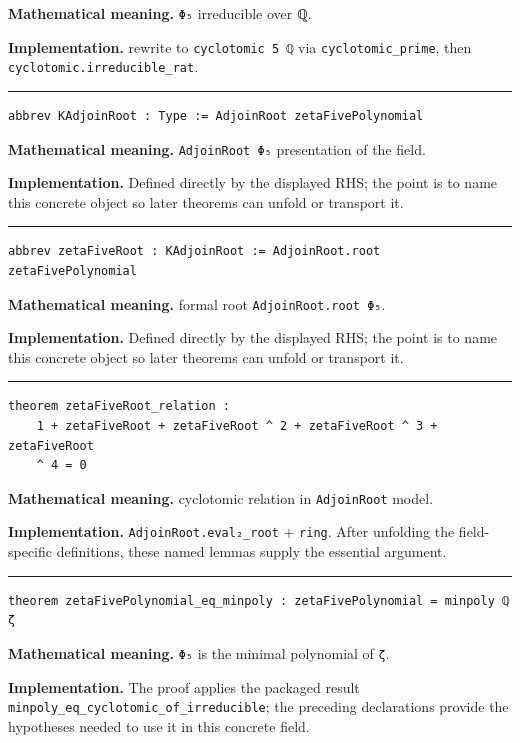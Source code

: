 \documentclass[UTF8,a4paper,11pt,fontset=fandol]{ctexart}
\theoremstyle{definition}
\newcommand{\statementsep}{\par\medskip\hrule\medskip}
\begin{document}
\noindent\textbf{Mathematical meaning.} \texttt{Φ₅} irreducible over ℚ.\par
\noindent\textbf{Implementation.} rewrite to \texttt{cyclotomic 5 ℚ} via \texttt{cyclotomic\_\allowbreak{}prime}, then \texttt{cyclotomic.\allowbreak{}irreducible\_\allowbreak{}rat}.\par
\statementsep
\begin{verbatim}
abbrev KAdjoinRoot : Type := AdjoinRoot zetaFivePolynomial
\end{verbatim}
\noindent\textbf{Mathematical meaning.} \texttt{AdjoinRoot Φ₅} presentation of the field.\par
\noindent\textbf{Implementation.} Defined directly by the displayed RHS; the point is to name this concrete object so later theorems can unfold or transport it.\par
\statementsep
\begin{verbatim}
abbrev zetaFiveRoot : KAdjoinRoot := AdjoinRoot.root zetaFivePolynomial
\end{verbatim}
\noindent\textbf{Mathematical meaning.} formal root \texttt{AdjoinRoot.\allowbreak{}root Φ₅}.\par
\noindent\textbf{Implementation.} Defined directly by the displayed RHS; the point is to name this concrete object so later theorems can unfold or transport it.\par
\statementsep
\begin{verbatim}
theorem zetaFiveRoot_relation :
    1 + zetaFiveRoot + zetaFiveRoot ^ 2 + zetaFiveRoot ^ 3 + zetaFiveRoot
    ^ 4 = 0
\end{verbatim}
\noindent\textbf{Mathematical meaning.} cyclotomic relation in \texttt{AdjoinRoot} model.\par
\noindent\textbf{Implementation.} \texttt{AdjoinRoot.\allowbreak{}eval₂\_\allowbreak{}root} + \texttt{ring}. After unfolding the field-specific definitions, these named lemmas supply the essential argument.\par
\statementsep
\begin{verbatim}
theorem zetaFivePolynomial_eq_minpoly : zetaFivePolynomial = minpoly ℚ ζ
\end{verbatim}
\noindent\textbf{Mathematical meaning.} \texttt{Φ₅} is the minimal polynomial of \texttt{ζ}.\par
\noindent\textbf{Implementation.} The proof applies the packaged result \texttt{minpoly\_\allowbreak{}eq\_\allowbreak{}cyclotomic\_\allowbreak{}of\_\allowbreak{}irreducible}; the preceding declarations provide the hypotheses needed to use it in this concrete field.\par
\end{document}
